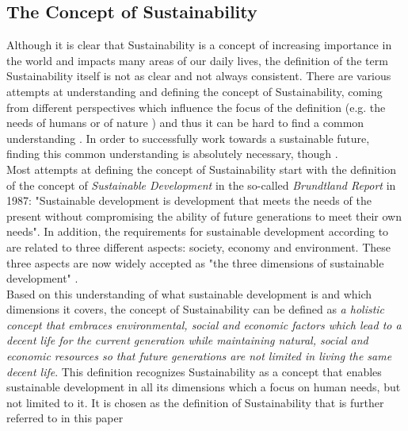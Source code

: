 \documentclass[oribibl]{llncs}
\begin{document}
\subsection{The Concept of Sustainability}
Although it is clear that Sustainability is a concept of increasing importance in the world and impacts many areas of our daily lives, the definition of the term Sustainability itself is not as clear and not always consistent. There are various attempts at understanding and defining the concept of Sustainability, coming from different perspectives which influence the focus of the definition (e.g. the needs of humans or of nature \cite{gladwin_shifting_1995}) and thus it can be hard to find a common understanding \cite{jamieson_sustainability_1998}%
. In order to successfully work towards a sustainable future, finding this common understanding is absolutely necessary, though \cite{jamieson_sustainability_1998}.\\
Most attempts at defining the concept of Sustainability start with the definition of the concept of \textit{Sustainable Development} in the so-called \textit{Brundtland Report} in 1987: "Sustainable development is development that meets the needs of the present without compromising the ability of future generations to meet their own needs"\cite[p.\,4]{Brundtland1987}. In addition, the requirements for sustainable development according to \cite{Brundtland1987} are related to three different aspects: society, economy and environment. These three aspects are now widely accepted as "the three dimensions of sustainable development" \cite[p.\,1]{UN_transform_15}.\\ %
Based on this understanding of what sustainable development is and which dimensions it covers, the concept of Sustainability can be defined as \textit{a holistic concept that embraces environmental, social and economic factors which lead to a decent life for the current generation while maintaining natural, social and economic resources so that future generations are not limited in living the same decent life}. %
This definition recognizes Sustainability as a concept that enables sustainable development in all its dimensions which a focus on human needs, but not limited to it. It is chosen as the definition of Sustainability that is further referred to in this paper
\end{document}
